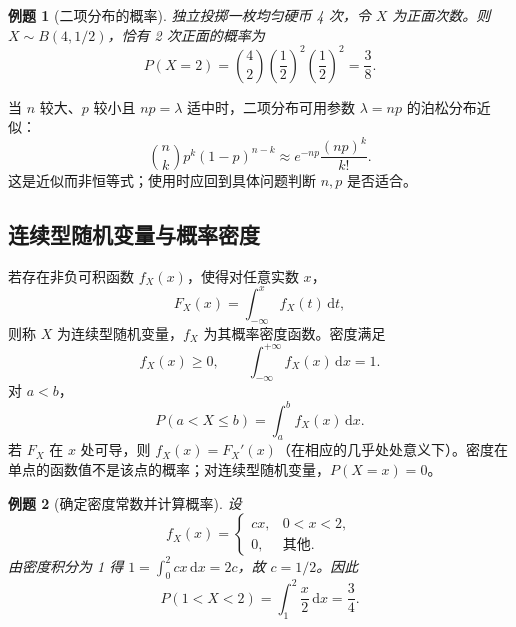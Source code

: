 \documentclass[11pt,a4paper,fontset=fandol]{ctexart}
\newtheorem{example}{例题}[section]
\theoremstyle{remark}
\begin{document}
\begin{example}[二项分布的概率]
独立投掷一枚均匀硬币 4 次，令 $X$ 为正面次数。则 $X\sim B(4,1/2)$，恰有 2 次正面的概率为
\[
    P(X=2)=\binom{4}{2}\left(\frac12\right)^2\left(\frac12\right)^2
    =\frac{3}{8}.
\]
\end{example}

当 $n$ 较大、$p$ 较小且 $np=\lambda$ 适中时，二项分布可用参数 $\lambda=np$ 的泊松分布近似：
\[
    \binom{n}{k}p^k(1-p)^{n-k}
    \approx e^{-np}\frac{(np)^k}{k!}.
\]
这是近似而非恒等式；使用时应回到具体问题判断 $n,p$ 是否适合。

\subsection{连续型随机变量与概率密度}
若存在非负可积函数 $f_X(x)$，使得对任意实数 $x$，
\[
    F_X(x)=\int_{-\infty}^{x}f_X(t)\,\mathrm{d}t,
\]
则称 $X$ 为连续型随机变量，$f_X$ 为其概率密度函数。密度满足
\[
    f_X(x)\geq 0,\qquad
    \int_{-\infty}^{+\infty}f_X(x)\,\mathrm{d}x=1.
\]
对 $a<b$，
\[
    P(a<X\leq b)=\int_a^b f_X(x)\,\mathrm{d}x.
\]
若 $F_X$ 在 $x$ 处可导，则 $f_X(x)=F_X'(x)$（在相应的几乎处处意义下）。密度在单点的函数值不是该点的概率；对连续型随机变量，$P(X=x)=0$。

\begin{example}[确定密度常数并计算概率]
设
\[
    f_X(x)=
    \begin{cases}
        c x, & 0<x<2,\\
        0, & \text{其他}.
    \end{cases}
\]
由密度积分为 1 得 $1=\int_0^2 cx\,\mathrm{d}x=2c$，故 $c=1/2$。因此
\[
    P(1<X<2)=\int_1^2\frac{x}{2}\,\mathrm{d}x=\frac{3}{4}.
\]
\end{example}
\end{document}
